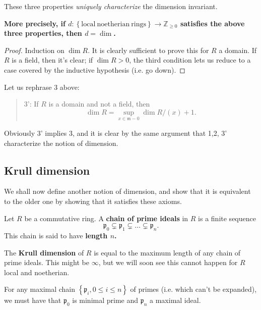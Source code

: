 These three properties \emph{uniquely characterize} the dimension invariant. 

\textbf{More precisely, if
$d: \left\{\mathrm{local \ noetherian \ rings}\right\} \to \mathbb{Z}_{\geq 0}$
satisfies the above three properties, then $d = \dim $. }
\begin{proof} 
Induction on $\dim R$. It is clearly sufficient to prove this for $R$ a domain. 
If $R$ is a field, then it's clear; if $\dim R>0$, the third condition lets us
reduce to a case covered by the inductive hypothesis (i.e. go down).
\end{proof} 

Let us rephrase 3 above:
\begin{quote}
3': If $R$ is a domain and not a field, then 
\[ \dim R = \sup_{x \in \mathfrak{m} - 0} \dim R/(x) + 1. \]
\end{quote}
Obviously 3' implies 3, and it is clear by the same argument that 1,2, 3'
characterize the notion of dimension.

\subsection{Krull dimension} We shall now define another notion of
dimension, and show that it is equivalent to the older one by showing that it
satisfies these axioms.

\begin{definition} 
Let $R$ be a commutative ring. A \textbf{chain of prime ideals} in $R$ is a finite
sequence
\[ \mathfrak{p}_0 \subsetneq \mathfrak{p}_1 \subsetneq \dots \subsetneq
\mathfrak{p}_n.  \]
This chain is said to have \textbf{length $n$.}
\end{definition} 

\begin{definition} 
The \textbf{Krull dimension} of $R$ is equal to the maximum length of any chain
of prime ideals. This might be $\infty$, but we will soon see this cannot
happen for $R$ local and noetherian.
\end{definition} 

\begin{remark} 
For any maximal chain $\left\{\mathfrak{p}_i, 0 \leq i \leq n\right\}$ of primes (i.e. which can't be expanded), we must have
that $\mathfrak{p}_0$ is minimal prime and $\mathfrak{p}_n$ a maximal ideal.
\end{remark} 

